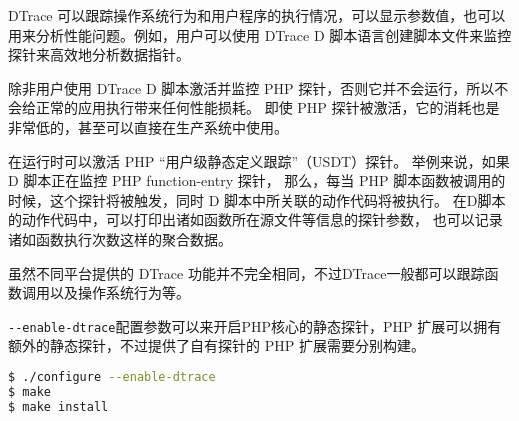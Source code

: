 DTrace 可以跟踪操作系统行为和用户程序的执行情况，可以显示参数值，也可以用来分析性能问题。例如，用户可以使用 DTrace D 脚本语言创建脚本文件来监控探针来高效地分析数据指针。


除非用户使用 DTrace D 脚本激活并监控 PHP 探针，否则它并不会运行，所以不会给正常的应用执行带来任何性能损耗。 即使 PHP 探针被激活，它的消耗也是非常低的，甚至可以直接在生产系统中使用。



在运行时可以激活 PHP “用户级静态定义跟踪”（USDT）探针。 举例来说，如果 D 脚本正在监控 PHP function-entry 探针， 那么，每当 PHP 脚本函数被调用的时候，这个探针将被触发，同时 D 脚本中所关联的动作代码将被执行。 在D脚本的动作代码中，可以打印出诸如函数所在源文件等信息的探针参数， 也可以记录诸如函数执行次数这样的聚合数据。


虽然不同平台提供的 DTrace 功能并不完全相同，不过DTrace一般都可以跟踪函数调用以及操作系统行为等。

\texttt{-\/-enable-dtrace}配置参数可以来开启PHP核心的静态探针，PHP 扩展可以拥有额外的静态探针，不过提供了自有探针的 PHP 扩展需要分别构建。

\begin{lstlisting}[language=bash]
$ ./configure --enable-dtrace
$ make
$ make install
\end{lstlisting}


